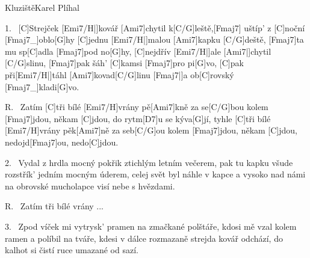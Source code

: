 \begin{song}{Kluziště}{Karel Plíhal}

\begin{xverse}{1.~}
[C]Strejček [Emi7/H|]{kovář} [Ami7]chytil k[C/G]leště,[Fmaj7] uštíp' z [C]noční [Fmaj7_]{oblo}[G]{hy}
[C]jednu [Emi7/H|]{malou} [Ami7]kapku [C/G]deště, [Fmaj7]ta mu sp[C]adla [Fmaj7]pod no[G]{hy,}
[C]nejdřív [Emi7/H|]{ale} [Ami7|]{chytil} [C/G]slinu, [Fmaj7]pak šáh' [C]kamsi [Fmaj7]pro pi[G]{vo,}
[C]pak při[Emi7/H|]{táhl} [Ami7]kovad[C/G]linu [Fmaj7|]{}a ob[C]rovský [Fmaj7_]{kladi}[G]{vo.}
\end{xverse}

\begin{xverse}{R.~}
Zatím [C]tři bílé [Emi7/H]vrány pě[Ami7]kně za se[C/G]bou
kolem [Fmaj7]jdou, někam [C]jdou, do rytm[D7]u se kýva[G]jí,
tyhle [C]tři bílé [Emi7/H]{vrány} pěk[Ami7]ně za seb[C/G]ou
kolem [Fmaj7]jdou, někam [C]jdou, nedojd[Fmaj7]ou, nedo[C]jdou.
\end{xverse}

\begin{xverse}{2.~}
Vydal z hrdla mocný pokřik ztichlým letním večerem,
pak tu kapku všude rozstřík' jedním mocným úderem,
celej svět byl náhle v kapce a vysoko nad námi
na obrovské mucholapce visí nebe s hvězdami.
\end{xverse}

\begin{xverse}{R.~}
Zatím tři bílé vrány ...
\end{xverse}

\begin{xverse}{3.~}
Zpod víček mi vytrysk' pramen na zmačkané polštáře,
kdosi mě vzal kolem ramen a políbil na tváře,
kdesi v dálce rozmazaně strejda kovář odchází,
do kalhot si čistí ruce umazané od sazí.
\end{xverse}
\end{song}
\chords{ \chordAmiSeven \chordFmajSeven }

